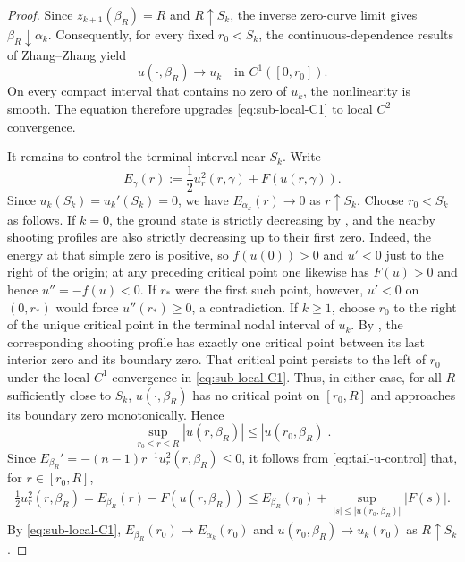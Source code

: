 \documentclass[11pt]{article}
\begin{document}
\begin{proof}
Since $z_{k+1}(\beta_R)=R$ and
$R\uparrow S_k$, the inverse zero-curve limit gives $\beta_R\downarrow\alpha_k$.
Consequently, for every fixed $r_0<S_k$, the continuous-dependence
results of Zhang--Zhang \cite{ZhangZhang} yield
\begin{equation}
u(\cdot,\beta_R)\rightarrow u_k
\quad\text{in }C^1([0,r_0]).
\label{eq:sub-local-C1}
\end{equation}
On every compact interval that contains no zero of $u_k$, the
nonlinearity is smooth. The equation therefore upgrades
\eqref{eq:sub-local-C1} to local $C^2$ convergence.

It remains to control the terminal interval near $S_k$. Write
\[
E_\gamma(r)
:=
\frac12u_r^2(r,\gamma)+F(u(r,\gamma)).
\]
Since $u_k(S_k)=u_k'(S_k)=0$,
we have $E_{\alpha_k}(r)\rightarrow0$ as $r\uparrow S_k$.
{Choose $r_0<S_k$ as follows.  If $k=0$, the ground state is
strictly decreasing by \cite[Proposition~2.5(ii)]{ZhangZhang}, and the nearby
shooting profiles are also strictly decreasing up to their first zero.  Indeed,
the energy at that simple zero is positive, so $f(u(0))>0$ and $u'<0$ just to
the right of the origin; at any preceding critical point one likewise has
$F(u)>0$ and hence $u''=-f(u)<0$.  If $r_*$ were the first such point, however,
$u'<0$ on $(0,r_*)$ would force $u''(r_*)\ge0$, a contradiction.  If $k\ge1$,
choose $r_0$ to the right of the unique critical point in the terminal nodal
interval of $u_k$.
By \cite[Proposition~2.5(iii)]{ZhangZhang}, the corresponding shooting
profile has exactly one critical point between its last interior zero and its
boundary zero.  That critical point persists to the left of $r_0$ under the
local $C^1$ convergence in \eqref{eq:sub-local-C1}.  Thus, in either case,
for all $R$ sufficiently close to $S_k$, $u(\cdot,\beta_R)$ has no critical
point on $[r_0,R]$ and approaches its boundary zero monotonically.} Hence
\begin{equation}
 \sup_{r_0\le r\le R}|u(r,\beta_R)|
 \le |u(r_0,\beta_R)|.
 \label{eq:tail-u-control}
\end{equation}
Since $E_{\beta_R}'=-(n-1)r^{-1}u_r^2(r,\beta_R)\le0$, it follows from \eqref{eq:tail-u-control} that, for $r\in [r_0,R]$,
\begin{align*}
 \frac12u_r^2(r,\beta_R)
 =E_{\beta_R}(r)-F(u(r,\beta_R))
 \le E_{\beta_R}(r_0)
 +\sup_{|s|\le |u(r_0,\beta_R)|}|F(s)|.
\end{align*}
By \eqref{eq:sub-local-C1}, $E_{\beta_R}(r_0)\rightarrow E_{\alpha_k}(r_0)$ and $u(r_0,\beta_R)\rightarrow u_k(r_0)$ as $R\uparrow S_k$.

\end{proof}
\end{document}
